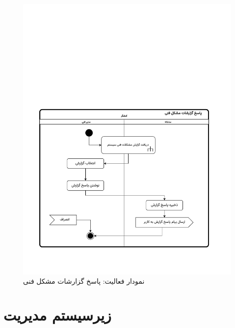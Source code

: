 \begin{figure}[ht!]
	\centering
	\includegraphics[scale=0.8, page=1]{figs/OOD-activity-techrepans.pdf}
	\caption{نمودار فعالیت: پاسخ گزارشات مشکل فنی}
\end{figure}
\FloatBarrier
\newpage



\section{زیرسیستم مدیریت}


